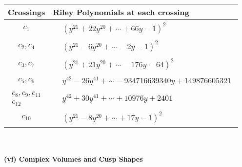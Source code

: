 \documentclass[1p]{elsarticle_modified}
\theoremstyle{definition}
\begin{document}
\begin{tabular}{m{50pt}|m{274pt}}
Crossings & \hspace{64pt}Riley Polynomials at each crossing \\
\hline $$\begin{aligned}c_{1}\end{aligned}$$&$\begin{aligned}
&(y^{21}+22 y^{20}+\cdots+66 y-1)^{2}
\end{aligned}$\\
\hline $$\begin{aligned}c_{2},c_{4}\end{aligned}$$&$\begin{aligned}
&(y^{21}-6 y^{20}+\cdots-2 y-1)^{2}
\end{aligned}$\\
\hline $$\begin{aligned}c_{3},c_{7}\end{aligned}$$&$\begin{aligned}
&(y^{21}+21 y^{20}+\cdots-176 y-64)^{2}
\end{aligned}$\\
\hline $$\begin{aligned}c_{5},c_{6}\end{aligned}$$&$\begin{aligned}
&y^{42}-26 y^{41}+\cdots-934716639340 y+149876605321
\end{aligned}$\\
\hline $$\begin{aligned}c_{8},c_{9},c_{11}\\c_{12}\end{aligned}$$&$\begin{aligned}
&y^{42}+30 y^{41}+\cdots+10976 y+2401
\end{aligned}$\\
\hline $$\begin{aligned}c_{10}\end{aligned}$$&$\begin{aligned}
&(y^{21}-8 y^{20}+\cdots+17 y-1)^{2}
\end{aligned}$\\
\hline
\end{tabular}\\~\\
\newpage\flushleft \textbf{(vi) Complex Volumes and Cusp Shapes}
\end{document}
